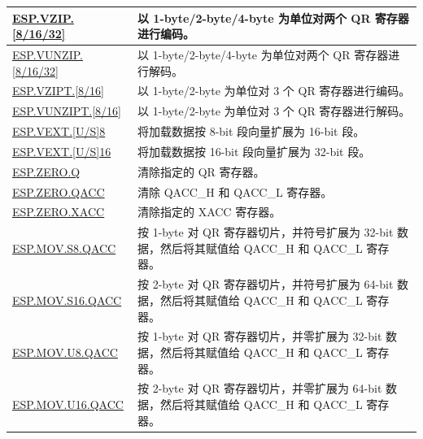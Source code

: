 \begin{longtable}[c]{|l|m{11cm}|}
    \hyperref[instruction:ESPVZIP8]{ESP.VZIP.[8/16/32]} & 以 1-byte/2-byte/4-byte 为单位对两个 QR 寄存器进行编码。\\\hline
    \hyperref[instruction:ESPVUNZIP8]{ESP.VUNZIP.[8/16/32]} & 以 1-byte/2-byte/4-byte 为单位对两个 QR 寄存器进行解码。\\\hline
    \hyperref[instruction:ESPVZIPT8]{ESP.VZIPT.[8/16]} & 以 1-byte/2-byte 为单位对 3 个 QR 寄存器进行编码。\\\hline
    \hyperref[instruction:ESPVUNZIPT8]{ESP.VUNZIPT.[8/16]} & 以 1-byte/2-byte 为单位对 3 个 QR 寄存器进行解码。\\\hline

    \hyperref[instruction:ESPVEXTS8]{ESP.VEXT.[U/S]8} & 将加载数据按 8-bit 段向量扩展为 16-bit 段。\\\hline
    \hyperref[instruction:ESPVEXTS16]{ESP.VEXT.[U/S]16} & 将加载数据按 16-bit 段向量扩展为 32-bit 段。\\\hline

    \hyperref[instruction:ESPZEROQ]{ESP.ZERO.Q} & 清除指定的 QR 寄存器。\\\hline
    \hyperref[instruction:ESPZEROQACC]{ESP.ZERO.QACC} & 清除 QACC\_H 和 QACC\_L 寄存器。\\\hline
    \hyperref[instruction:ESPZEROXACC]{ESP.ZERO.XACC} & 清除指定的 XACC 寄存器。\\\hline

    \hyperref[instruction:ESPMOVS8QACC]{ESP.MOV.S8.QACC} & 按 1-byte 对 QR 寄存器切片，并符号扩展为 32-bit 数据，然后将其赋值给 QACC\_H 和 QACC\_L 寄存器。\\\hline
    \hyperref[instruction:ESPMOVS16QACC]{ESP.MOV.S16.QACC} & 按 2-byte 对 QR 寄存器切片，并符号扩展为 64-bit 数据，然后将其赋值给 QACC\_H 和 QACC\_L 寄存器。\\\hline
    \hyperref[instruction:ESPMOVU8QACC]{ESP.MOV.U8.QACC} & 按 1-byte 对 QR 寄存器切片，并零扩展为 32-bit 数据，然后将其赋值给 QACC\_H 和 QACC\_L 寄存器。\\\hline
    \hyperref[instruction:ESPMOVU16QACC]{ESP.MOV.U16.QACC} & 按 2-byte 对 QR 寄存器切片，并零扩展为 64-bit 数据，然后将其赋值给 QACC\_H 和 QACC\_L 寄存器。\\\hline

\end{longtable}
